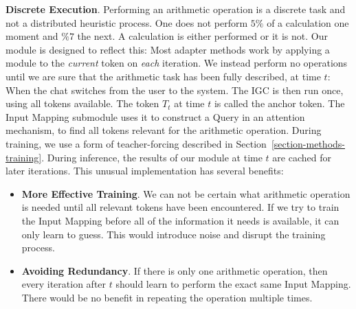 \documentclass[11pt]{article}
\begin{document}
\textbf{Discrete Execution}.
Performing an arithmetic operation is a discrete task and not a distributed heuristic process. One does not perform $5\%$ of a calculation one moment and $\%7$ the next. A calculation is either performed or it is not. Our module is designed to reflect this:
Most adapter methods work by applying a module to the \textit{current} token on \textit{each} iteration.
We instead perform no operations until we are sure that the arithmetic task has been fully described, at time $t$: When the chat switches from the user to the system.
The IGC is then run once, using all tokens available. The token $T_t$ at time $t$ is called the anchor token. The Input Mapping submodule uses it to construct a Query in an attention mechanism, to find all tokens relevant for the arithmetic operation.
During training, we use a form of teacher-forcing described in Section~\ref{section-methods-training}.
During inference, the results of our module at time $t$ are cached for later iterations.
This unusual implementation has several benefits:
\begin{itemize}
    \item \textbf{More Effective Training}.
    We can not be certain what arithmetic operation is needed until all relevant tokens have been encountered. If we try to train the Input Mapping before all of the information it needs is available, it can only learn to guess. This would introduce noise and disrupt the training process.
    \item \textbf{Avoiding Redundancy}.
    If there is only one arithmetic operation, then every iteration after $t$ should learn to perform the exact same Input Mapping. There would be no benefit in repeating the operation multiple times.
\end{itemize}
\end{document}
